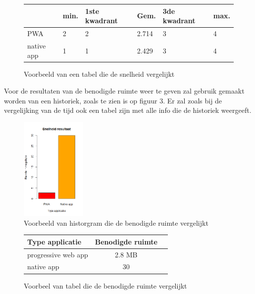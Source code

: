 \begin{figure}[!h]
	\begin{tabularx}{\textwidth /2 }{|X|X|X|X|X|X|}
		\hline
		 & min. & 1ste kwadrant & Gem. & 3de kwadrant & max. \\
		\hline
		PWA & 2 & 2 & 2.714 & 3 & 4 \\
		\hline
		native app & 1 & 1 & 2.429 & 3 & 4 \\
		\hline
	\end{tabularx}
	\caption{Voorbeeld van een tabel die de snelheid vergelijkt}
\end{figure}


Voor de resultaten van de benodigde ruimte weer te geven zal gebruik gemaakt worden van een historiek, zoals te zien is op figuur 3. Er zal zoals bij de vergelijking van de tijd ook een tabel zijn met alle info die de historiek weergeeft.

\begin{figure}[!h]
	\includegraphics[width=120px]{Rplot_Ruimte_PWAvsNativeApp.png}\centering
	\caption{Voorbeeld van historgram die de benodigde ruimte vergelijkt}
\end{figure}


\begin{figure}[!h]
\begin{tabular}{ |p{10em}|c|c| }
	\hline
	Type applicatie & Benodigde ruimte \\
	\hline
	progressive web app & 2.8 MB \\
	\hline
	native app & 30 \\
	\hline
\end{tabular}
\caption{Voorbeel van tabel die de benodigde ruimte vergelijkt}
\end{figure}



